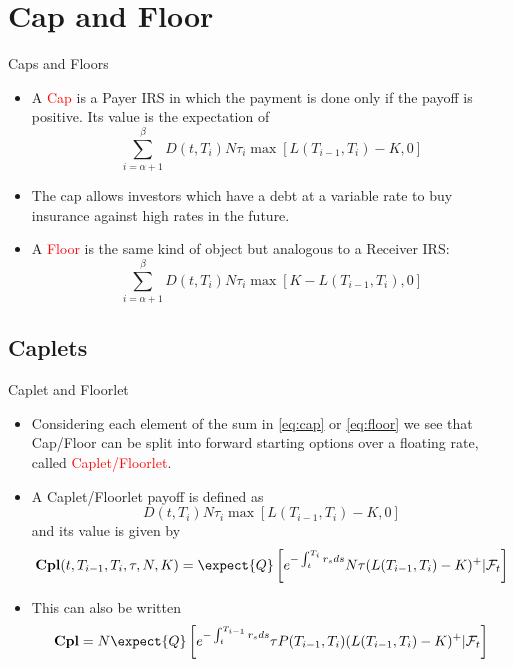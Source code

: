 \documentclass{beamer}
\begin{document}
\section{Cap and Floor}
\begin{frame}{Caps and Floors}
	\begin{itemize}
		\item<1-> A \textcolor{red}{Cap} is a Payer IRS in which the payment is done only if the payoff is positive. Its value is the expectation of 
		\begin{equation}
			\sum_{i=\alpha+1}^{\beta}D(t,T_i)N\tau_i\max\left[L(T_{i-1},T_i)-K,0\right]
			\label{eq:cap}
		\end{equation} 
		\item<2-> The cap allows investors which have a debt at a variable rate to buy insurance against high rates in the future.
		\item<3-> A \textcolor{red}{Floor} is the same kind of object but analogous to a Receiver IRS:
		\begin{equation}
			\sum_{i=\alpha+1}^{\beta}D(t,T_i)N\tau_i\max\left[K-L(T_{i-1},T_i),0\right]
			\label{eq:floor}
		\end{equation} 
	\end{itemize}
\end{frame}

\subsection{Caplets}
\begin{frame}{Caplet and Floorlet}
	\begin{itemize}
		\item<1-> Considering each element of the sum in \cref{eq:cap} or \cref{eq:floor} we see that Cap/Floor can be split into forward starting options over a floating rate, called \textcolor{red}{Caplet/Floorlet}.
		\item<2-> A Caplet/Floorlet payoff is defined as
		\begin{equation*}
			D(t,T_i)N\tau_i\max\left[L(T_{i-1},T_i)-K,0\right]
		\end{equation*} 
		and its value is given by
		\begin{equation}
			\textbf{Cpl}(t,T_{i-1},T_i,\tau,N,K)=\expect{Q}\left[e^{-\int_t^{T_i}r_s ds}N\tau(L(T_{i-1},T_i)-K)^+ | \mathcal{F}_t\right]
		\end{equation}
		\item<3-> This can also be written
		\begin{equation*}
			\textbf{Cpl}=N\expect{Q}\left[e^{-\int_t^{T_{i-1}}r_s ds}\tau P(T_{i-1},T_i)(L(T_{i-1},T_i)-K)^+ | \mathcal{F}_t\right]
		\end{equation*}
	\end{itemize}
\end{frame}
\end{document}

